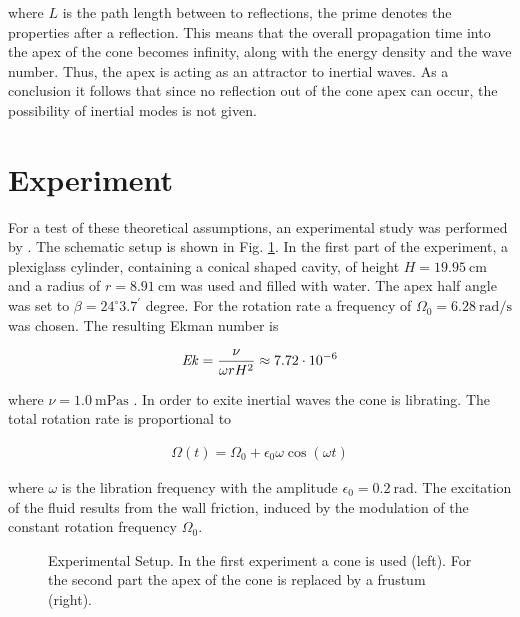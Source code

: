 where $L$ is the path length between to reflections, the prime denotes the properties after a reflection.
This means that the overall propagation time into the apex of the cone becomes infinity, along with the energy density and the wave number.
Thus, the apex is acting as an attractor to inertial waves.
As a conclusion it follows that since no reflection out of the cone apex can occur, the possibility of inertial modes is not given.

\section{Experiment}
\label{cone:theorie_exp}

For a test of these theoretical assumptions, an experimental study was performed by \citep{Beardsley1970}.
The schematic setup is shown in Fig. \ref{cone:setup_experiment}.
In the first part of the experiment, a plexiglass cylinder, containing a conical shaped cavity,
of height $H=\SI{19.95}{\centi\meter}$ and a radius of $r=\SI{8.91}{\centi\meter}$ was used and filled with water.
The apex half angle was set to $\beta=24^{\circ}3.7^{\prime}$ degree.
For the rotation rate a frequency of $\Omega_0 =\SI{6.28}{\radian\per\second}$ was chosen.
The resulting Ekman number is

\begin{align}
    \mbox{\textit{Ek}} = \frac{\nu}{\omega r H^2} \approx 7.72\cdot 10^{-6}
\end{align}

where $\nu = \SI{1.0}{\milli\pascal\second}$  \citep{tipler2003}.
In order to exite inertial waves the cone is librating.
The total rotation rate is proportional to

\begin{align}
\Omega(t) = \Omega_0 + \epsilon_0 \omega \cos(\omega t)
\end{align}

where $\omega$ is the libration frequency with the amplitude $\epsilon_0=\SI{0.2}{\radian}$.
The excitation of the fluid results from the wall friction, induced
by the modulation of the constant rotation frequency $\Omega_0$.

\begin{figure}[!b]
      \centering
      \caption{
          Experimental Setup. In the first experiment a cone is used (left). For the second part the apex of the cone
          is replaced by a frustum (right).
      \label{cone:setup_experiment}
      }
\end{figure}

